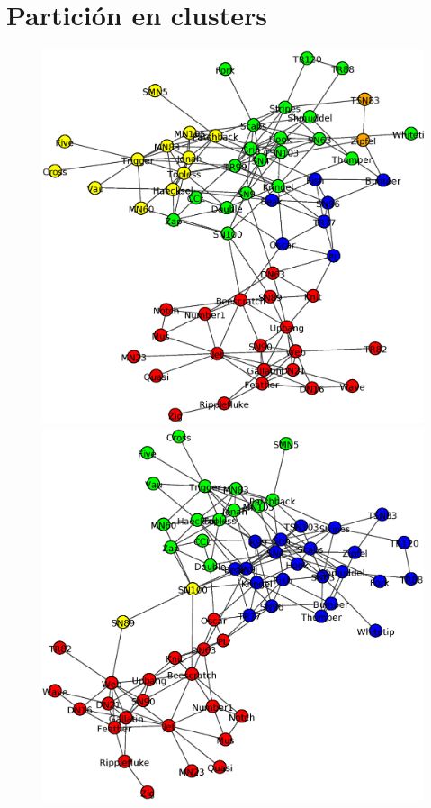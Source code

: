 \section{Partición en clusters}

\begin{figure}
\centering
\includegraphics[scale = 0.2]{figuras/Edge_betweenness}
\includegraphics[scale = 0.2]{figuras/Fast_greedy} \\

\end{figure}

